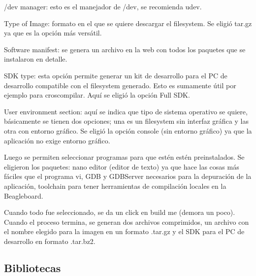 /dev manager: esto es el manejador de /dev, se recomienda udev.

Type of Image: formato en el que se quiere descargar el filesystem. Se eligió tar.gz ya que es la opción más versátil.

Software manifest: se genera un archivo en la web con todos los paquetes que se instalaron en detalle.

SDK type: esta opción permite generar un kit de desarrollo para el PC de desarrollo compatible con el filesystem generado. Esto es sumamente útil por ejemplo para croscompilar. Aquí se eligió la opción Full SDK.

User environment section: aquí se indica que tipo de sistema operativo se quiere, básicamente se tienen dos opciones; una es un filesystem sin interfaz gráfica y las otra con entorno gráfico. Se eligió la opción console (sin entorno gráfico) ya que la aplicación no exige entorno gráfico.

\bigskip
Luego se permiten seleccionar programas para que estén estén preinstalados.
Se eligieron los paquetes: nano editor (editor de texto) ya que hace las cosas más fáciles que el programa vi, GDB y GDBServer necesarios para la depuración de la aplicación, toolchain para tener herramientas de compilación locales en la Beagleboard.

\bigskip
Cuando todo fue seleccionado, se da un click en build me (demora un poco).
Cuando el proceso termina, se generan dos archivos comprimidos, un archivo con el nombre elegido para la imagen en un formato .tar.gz y el SDK para el PC de desarrollo en formato .tar.bz2. 

\subsection{Bibliotecas}


